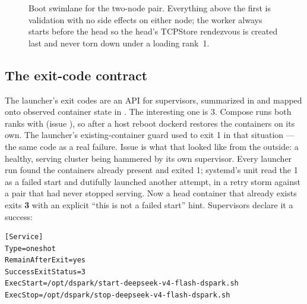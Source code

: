 \begin{figure}[htbp]
\caption{Boot swimlane for the two-node pair. Everything above the first
 is validation with no side effects on either node; the worker
always starts before the head so the head's TCPStore rendezvous is created
last and never torn down under a loading rank~1.}
\label{fig:ops-boot-swimlane}
\end{figure}

\subsection{The exit-code contract}

The launcher's exit codes are an API for supervisors, summarized in
 and mapped onto observed container state in
. The interesting one is 3. Compose runs both ranks
with  (issue ), so after a host
reboot dockerd restores the containers on its own. The launcher's
existing-container guard used to exit 1 in that situation --- the same code as
a real failure. Issue  is what that looked like from the outside:
a healthy, serving cluster being hammered by its own supervisor. Every
launcher run found the containers already present and exited 1; systemd's
 unit read the 1 as a failed start and dutifully
launched another attempt, in a retry storm against a pair that had never
stopped serving.
Now a head container that already exists exits \textbf{3} with an explicit
``this is not a failed start'' hint. Supervisors declare it a success:

\begin{lstlisting}
[Service]
Type=oneshot
RemainAfterExit=yes
SuccessExitStatus=3
ExecStart=/opt/dspark/start-deepseek-v4-flash-dspark.sh
ExecStop=/opt/dspark/stop-deepseek-v4-flash-dspark.sh
\end{lstlisting}

